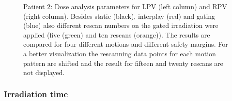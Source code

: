 \begin{figure}[H]
{ }
\caption{Patient 2: Dose analysis parameters for LPV (left column) and RPV (right column). Besides static (black), interplay (red) and gating 
(blue) also different rescan numbers on the gated irradiation were applied (five (green) and ten rescans (orange)). The results are compared 
for four different motions and different safety margins. For a better visualization the rescanning data points for each motion pattern are 
shifted and the result for fifteen and twenty rescans are not displayed.}
\label{static_interplay_gating_rescan_Pat02}
\end{figure}

\newpage


\subsubsection{Irradiation time}

